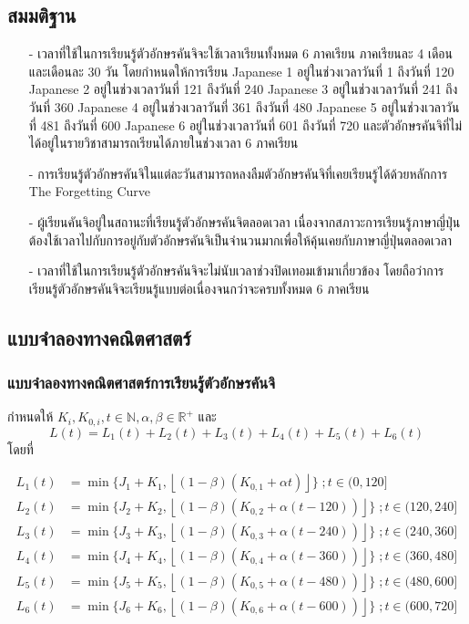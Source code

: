 \documentclass{article}
\begin{document}
\subsection{สมมติฐาน}
\begin{itemize}
	\item[-] เวลาที่ใช้ในการเรียนรู้ตัวอักษรคันจิจะใช้เวลาเรียนทั้งหมด 6 ภาคเรียน ภาคเรียนละ 4 เดือน และเดือนละ 30 วัน โดยกำหนดให้การเรียน Japanese 1 อยู่ในช่วงเวลาวันที่ 1 ถึงวันที่ 120 Japanese 2 อยู่ในช่วงเวลาวันที่ 121 ถึงวันที่ 240 Japanese 3 อยู่ในช่วงเวลาวันที่ 241 ถึงวันที่ 360 Japanese 4 อยู่ในช่วงเวลาวันที่ 361 ถึงวันที่ 480 Japanese 5 อยู่ในช่วงเวลาวันที่ 481 ถึงวันที่ 600 Japanese 6 อยู่ในช่วงเวลาวันที่ 601 ถึงวันที่ 720 และตัวอักษรคันจิที่ไม่ได้อยู่ในรายวิชาสามารถเรียนได้ภายในช่วงเวลา 6 ภาคเรียน
	\item[-] การเรียนรู้ตัวอักษรคันจิในแต่ละวันสามารถหลงลืมตัวอักษรคันจิที่เคยเรียนรู้ได้ด้วยหลักการ The Forgetting Curve\cite{ebbinghaus1913memory} 
	\item[-] ผู้เรียนคันจิอยู่ในสถานะที่เรียนรู้ตัวอักษรคันจิตลอดเวลา เนื่องจากสภาวะการเรียนรู้ภาษาญี่ปุ่นต้องใช้เวลาไปกับการอยู่กับตัวอักษรคันจิเป็นจำนวนมากเพื่อให้คุ้นเคยกับภาษาญี่ปุ่นตลอดเวลา
	\item[-] เวลาที่ใช้ในการเรียนรู้ตัวอักษรคันจิจะไม่นับเวลาช่วงปิดเทอมเข้ามาเกี่ยวข้อง โดยถือว่าการเรียนรู้ตัวอักษรคันจิจะเรียนรู้แบบต่อเนื่องจนกว่าจะครบทั้งหมด 6 ภาคเรียน
\end{itemize}
\subsection{แบบจำลองทางคณิตศาสตร์}
\subsubsection{แบบจำลองทางคณิตศาสตร์การเรียนรู้ตัวอักษรคันจิ}
กำหนดให้ $ K_i , K_{0,i} , t \in \mathbb{N} , \alpha , \beta \in \mathbb{R}^+ $ และ 
$$ L(t) = L_1(t) + L_2(t) + L_3(t) + L_4(t) + L_5(t) + L_6(t) $$
โดยที่
\begin{center}
\begin{align*}
L_1(t) & = \min \{J_1 + K_1, \left\lfloor (1 - \beta)(K_{0,1} + \alpha{t}) \right\rfloor\} \; ; t \in (0,120] \\
L_2(t) & = \min \{J_2 + K_2, \left\lfloor (1 - \beta)(K_{0,2} + \alpha{(t - 120)}) \right\rfloor\} \; ; t \in (120,240] \\
L_3(t) & = \min \{J_3 + K_3, \left\lfloor (1 - \beta)(K_{0,3} + \alpha{(t - 240)}) \right\rfloor\} \; ; t \in (240,360] \\
L_4(t) & = \min \{J_4 + K_4, \left\lfloor (1 - \beta)(K_{0,4} + \alpha{(t - 360)}) \right\rfloor\} \; ; t \in (360,480] \\
L_5(t) & = \min \{J_5 + K_5, \left\lfloor (1 - \beta)(K_{0,5} + \alpha{(t - 480)}) \right\rfloor\} \; ; t \in (480,600] \\
L_6(t) & = \min \{J_6 + K_6, \left\lfloor (1 - \beta)(K_{0,6} + \alpha{(t - 600)}) \right\rfloor\} \; ; t \in (600,720] 
\end{align*}
\end{center}
\end{document}
